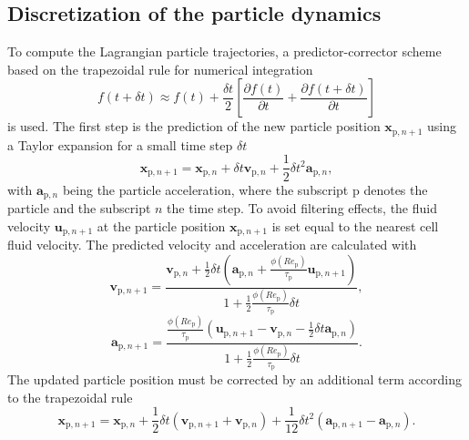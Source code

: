 \documentclass[11pt,a4paper,openany,oneside,parskip=half*]{article}
\renewcommand*\vec[1]{\boldsymbol{#1}}
\begin{document}
\subsection{Discretization of the particle dynamics}
To compute the Lagrangian particle trajectories, a predictor-corrector scheme based on the trapezoidal rule for numerical integration
\begin{equation}
f (t + \delta t) \approx f(t) + \frac{\delta t}{2} \left[ \frac{\partial f(t)}{\partial t} + \frac{\partial f(t + \delta t)}{\partial t} \right ]
\end{equation}
is used.
\newline
The first step is the prediction of the new particle position $\vec{x}_{\mathrm{p}, n+1}$ using a Taylor expansion for a small time step $\delta t$
\begin{equation}
\vec{x}_{\mathrm{p}, n+1} = \vec{x}_{\mathrm{p}, n} + \delta t \vec{v}_{\mathrm{p}, n} + \frac{1}{2} \delta t^2 \vec{a}_{\mathrm{p}, n},
\end{equation}
with $\vec{a}_{\mathrm{p}, n}$ being the particle acceleration, where the subscript $\mathrm{p}$ denotes the particle and the subscript $n$ the time step.
To avoid filtering effects, the fluid velocity $\vec{u}_{\mathrm{p}, n+1}$ at the particle position $\vec{x}_{\mathrm{p}, n+1}$ is set equal to the nearest cell fluid velocity. 
The predicted velocity and acceleration are calculated with
\begin{equation}
\vec{v}_{\mathrm{p}, n+1} = \frac{\vec{v}_{\mathrm{p},n} + \frac{1}{2} \delta t \left(\vec{a}_{{\mathrm{p}, n}} + \frac{\phi(Re_\mathrm{p})}{\tau_\mathrm{p}}\vec{u}_{\mathrm{p}, n+1} \right)}{1 + \frac{1}{2} \frac{\phi(Re_\mathrm{p})}{\tau_\mathrm{p}} \delta t},
\end{equation}
\begin{equation}
\vec{a}_{\mathrm{p}, n+1} = \frac{\frac{\phi(Re_\mathrm{p})}{\tau_\mathrm{p}} \left(\vec{u}_{\mathrm{p}, n+1} - \vec{v}_{\mathrm{p}, n} - \frac{1}{2} \delta t \vec{a}_{\mathrm{p}, n} \right)}{1 + \frac{1}{2} \frac{\phi(Re_\mathrm{p})}{\tau_\mathrm{p}} \delta t}.
\end{equation}
The updated particle position must be corrected by an additional term according to the trapezoidal rule
\begin{equation}
\vec{x}_{\mathrm{p}, n+1} = \vec{x}_{\mathrm{p}, n} + \frac{1}{2} \delta t \left( \vec{v}_{\mathrm{p}, n+1} + \vec{v}_{\mathrm{p}, n} \right) + \frac{1}{12} \delta t^2 \left( \vec{a}_{\mathrm{p}, n+1} - \vec{a}_{\mathrm{p}, n} \right).
\end{equation}
\end{document}
